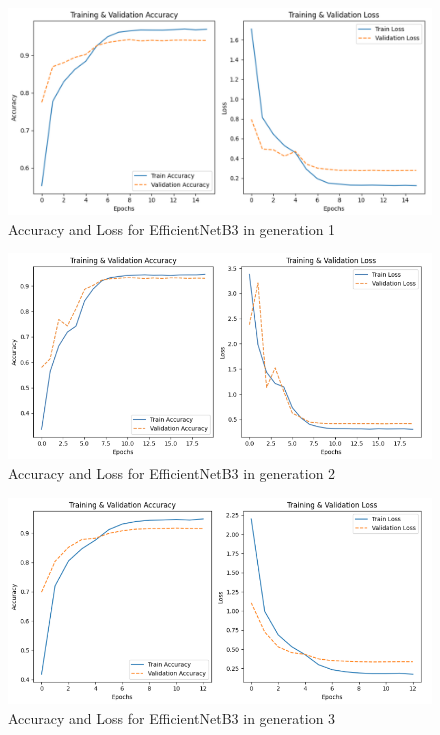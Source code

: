 \begin{figure}[htbp]
      \centering
      \includegraphics[scale=0.2]{images/GA_EfficientNet1.png}
      \caption{Accuracy and Loss for EfficientNetB3 in generation 1}
\end{figure}
\begin{figure}[htbp]
      \centering
      \includegraphics[scale=0.9]{images/GA_EfficientNet2.png}
      \caption{Accuracy and Loss for EfficientNetB3 in generation 2}
\end{figure}
\begin{figure}[htbp]
      \centering
      \includegraphics[scale=0.45]{images/GA_EfficientNet3.png}
      \caption{Accuracy and Loss for EfficientNetB3 in generation 3}
\end{figure}
